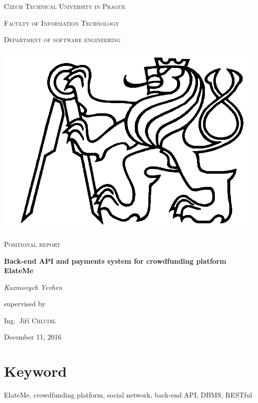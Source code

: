 \documentclass[12pt,a4paper]{report}
\begin{document}
\begin{titlepage}
	\centering
	{\scshape\Large Czech Technical University in Prague\par}
	\vspace{0.3cm}
	{\scshape\large Faculty of Information Technology\par}
	\vspace{0.3cm}
	{\scshape Department of software engineering\par}
	\vspace{1cm}
	\includegraphics[scale=0.3]{cvut.png}\par
	\vspace{2cm}
	{\scshape\LARGE Positional report\par}
	\vspace{1cm}
	{\Large\bfseries Back-end API and payments system for crowdfunding platform ElateMe\par}
	\vspace{3cm}
	{\large\itshape Kuzmovych Yevhen\par}
	\vfill
	supervised by\par
	Ing.~Jiří \textsc{Chludil}
	\vfill

	{\large December 11, 2016\par}
\end{titlepage}




\tableofcontents
\renewcommand{\thesection}{\arabic{section}}

\vfill

\section*{Keyword}
ElateMe, crowdfunding platform, social network, back-end API, DBMS, RESTful
\end{document}
